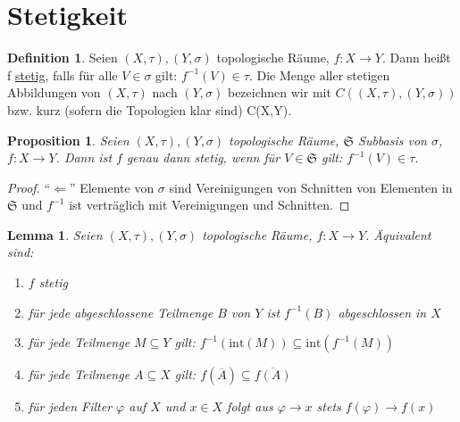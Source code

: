 \documentclass[12pt]{scrartcl}%
\newtheorem{prop}{Proposition}
\newtheorem{lemma}{Lemma}
\theoremstyle{definition}
\newtheorem*{defn}{Definition}
\theoremstyle{remark}
\newcommand{\interior}{\text{int}}
\newcommand\Inv[1]{#1^{-1}}
\begin{document}
\section*{Stetigkeit}

\begin{defn}
    Seien $(X,\tau), (Y,\sigma)$ topologische Räume, $f:X\to Y$. Dann heißt f \underline{stetig}, falls für alle $V\in\sigma$ gilt: $\Inv f(V)\in\tau$. Die Menge aller stetigen Abbildungen von $(X,\tau)$ nach $(Y,\sigma)$ bezeichnen wir mit $C((X,\tau),(Y,\sigma))$ bzw. kurz (sofern die Topologien klar sind) C(X,Y).
\end{defn}

\begin{prop}
    Seien $(X,\tau),(Y,\sigma)$ topologische Räume, $\mathfrak{S}$ Subbasis von $\sigma$, $f:X\to Y$. Dann ist $f$ genau dann stetig, wenn für $V\in\mathfrak{S}$ gilt: $\Inv f(V)\in\tau$.
\end{prop}

\begin{proof}
    \enquote{$\Leftarrow$} Elemente von $\sigma$ sind Vereinigungen von Schnitten von Elementen in $\mathfrak{S}$ und $\Inv f$ ist verträglich mit Vereinigungen und Schnitten.
\end{proof}

\begin{lemma}
    Seien $(X,\tau),(Y,\sigma)$ topologische Räume, $f:X\to Y$. Äquivalent sind:

    \begin{enumerate}[label=(\arabic*)]
        \item $f$ stetig
        \item für jede abgeschlossene Teilmenge $B$ von $Y$ ist $\Inv f(B)$ abgeschlossen in $X$
        \item für jede Teilmenge $M\subseteq Y$ gilt: $\Inv f(\interior(M)) \subseteq \interior(\Inv f(M))$
        \item für jede Teilmenge $A\subseteq X$ gilt: $f(\overline{A}) \subseteq \overline{f(A)}$
        \item für jeden Filter $\varphi$ auf $X$ und $x\in X$ folgt aus $\varphi\to x$ stets $f(\varphi)\to f(x)$
    \end{enumerate}
\end{lemma}
\end{document}
